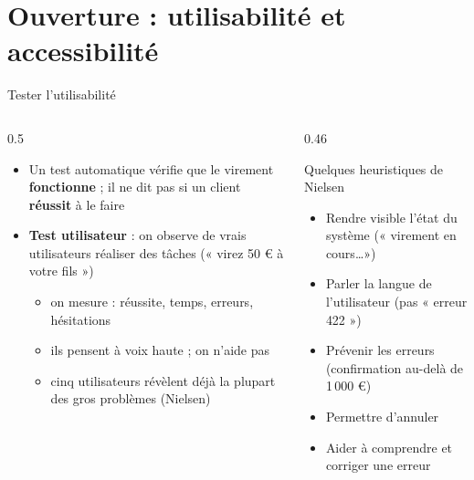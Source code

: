 \documentclass[aspectratio=169,10pt]{beamer}
\begin{document}
\section{Ouverture : utilisabilité et accessibilité}

\begin{frame}{Tester l'utilisabilité}
  \begin{columns}[T]
    \begin{column}{0.5\textwidth}
      \begin{itemize}
        \item Un test automatique vérifie que le virement \textbf{fonctionne} ; il ne dit pas si un client \textbf{réussit} à le faire
        \item \textbf{Test utilisateur} : on observe de vrais utilisateurs réaliser des tâches (« virez 50 \euro{} à votre fils »)
          \begin{itemize}
            \item on mesure : réussite, temps, erreurs, hésitations
            \item ils pensent à voix haute ; on n'aide pas
            \item cinq utilisateurs révèlent déjà la plupart des gros problèmes (Nielsen)
          \end{itemize}
      \end{itemize}
    \end{column}
    \begin{column}{0.46\textwidth}
      \begin{block}{Quelques heuristiques de Nielsen}
        \small
        \begin{itemize}
          \item Rendre visible l'état du système (« virement en cours\ldots »)
          \item Parler la langue de l'utilisateur (pas « erreur 422 »)
          \item Prévenir les erreurs (confirmation au-delà de 1\,000 \euro{})
          \item Permettre d'annuler
          \item Aider à comprendre et corriger une erreur
        \end{itemize}
      \end{block}
    \end{column}
  \end{columns}
\end{frame}
\end{document}
